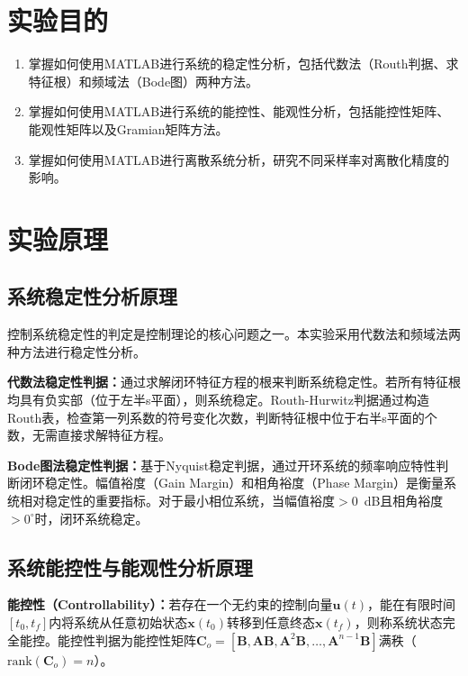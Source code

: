 \documentclass{../common/SCNU_Experimental_Report}
\begin{document}
\maketitle

\section{实验目的}
\begin{enumerate}
    \item 掌握如何使用MATLAB进行系统的稳定性分析，包括代数法（Routh判据、求特征根）和频域法（Bode图）两种方法。
    \item 掌握如何使用MATLAB进行系统的能控性、能观性分析，包括能控性矩阵、能观性矩阵以及Gramian矩阵方法。
    \item 掌握如何使用MATLAB进行离散系统分析，研究不同采样率对离散化精度的影响。
\end{enumerate}

\section{实验原理}
\subsection{系统稳定性分析原理}
控制系统稳定性的判定是控制理论的核心问题之一。本实验采用代数法和频域法两种方法进行稳定性分析。

\textbf{代数法稳定性判据：}通过求解闭环特征方程的根来判断系统稳定性。若所有特征根均具有负实部（位于左半s平面），则系统稳定。Routh-Hurwitz判据通过构造Routh表，检查第一列系数的符号变化次数，判断特征根中位于右半s平面的个数，无需直接求解特征方程。

\textbf{Bode图法稳定性判据：}基于Nyquist稳定判据，通过开环系统的频率响应特性判断闭环稳定性。幅值裕度（Gain Margin）和相角裕度（Phase Margin）是衡量系统相对稳定性的重要指标。对于最小相位系统，当幅值裕度$>0$~dB且相角裕度$>0^\circ$时，闭环系统稳定。

\subsection{系统能控性与能观性分析原理}
\textbf{能控性（Controllability）：}若存在一个无约束的控制向量$\boldsymbol{u}(t)$，能在有限时间$[t_0, t_f]$内将系统从任意初始状态$\boldsymbol{x}(t_0)$转移到任意终态$\boldsymbol{x}(t_f)$，则称系统状态完全能控。能控性判据为能控性矩阵$\boldsymbol{C}_o = [\boldsymbol{B}, \boldsymbol{AB}, \boldsymbol{A}^2\boldsymbol{B}, \ldots, \boldsymbol{A}^{n-1}\boldsymbol{B}]$满秩（$\text{rank}(\boldsymbol{C}_o) = n$）。
\end{document}

